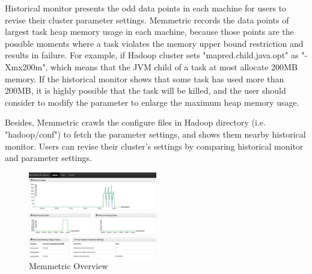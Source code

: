 Historical monitor presents the odd data points in each machine for users to revise their cluster parameter settings. Memmetric records the data points of largest task heap memory usage in each machine, because those points are the possible moments where a task violates the memory upper bound restriction and results in failure. For example, if Hadoop cluster sets "mapred.child.java.opt" as "-Xmx200m", which means that  the JVM child of a task at most allocate 200MB memory. If the historical monitor shows that some task has used more than 200MB, it is highly possible that the task will be killed, and the user should consider to modify the parameter to enlarge the maximum heap memory usage.

Besides, Memmetric crawls the configure files in Hadoop directory (i.e. "hadoop/conf") to fetch the parameter settings, and shows them nearby historical monitor. Users can revise their cluster's settings by comparing historical monitor and parameter settings. 

\begin{figure}[h!]
  \centering
    \includegraphics[width=0.5\textwidth]{image/overview.png}
  \caption{Memmetric Overview}
\end{figure}

